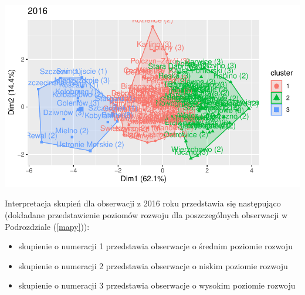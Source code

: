 \documentclass{amuthesis}
\begin{document}
\begin{center}\includegraphics[width=1.05\linewidth]{figures/rycina5 -1} \end{center}

Interpretacja skupień dla obserwacji z 2016 roku przedstawia się następująco (dokładane przedstawienie poziomów rozwoju dla poszczególnych obserwacji w Podrozdziale (\ref{mapy})):

\begin{itemize}
\tightlist
\item
  skupienie o numeracji 1 przedstawia obserwacje o średnim poziomie rozwoju
\item
  skupienie o numeracji 2 przedstawia obserwacje o niskim poziomie rozwoju
\item
  skupienie o numeracji 3 przedstawia obserwacje o wysokim poziomie rozwoju
\end{itemize}

\begin{Shaded}
\begin{Highlighting}[]
\OtherTok{\textless{}{-}} \SpecialCharTok{$} \NormalTok{, } \NormalTok{)}
\SpecialCharTok{::}\SpecialCharTok{+}\SpecialCharTok{::}\NormalTok{(}\NormalTok{)}
\end{Highlighting}
\end{Shaded}
\end{document}
